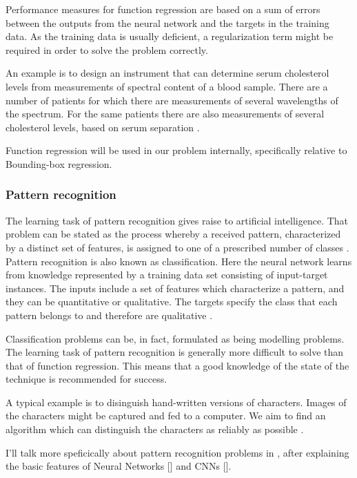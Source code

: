Performance measures for function regression are based on a sum of errors between the outputs from the neural network and the targets in the training data.
As the training data is usually deficient, a regularization term might be required in order to solve the problem correctly.

An example is to design an instrument that can determine serum cholesterol levels from
measurements of spectral content of a blood sample. There are a number of 
patients for which there are measurements of several wavelengths of the spectrum.
For the same patients there are also measurements of several
cholesterol levels, based on serum separation \cite{Demuth2009}.

Function regression will be used in our problem internally, specifically relative to Bounding-box regression.


\subsubsection{Pattern recognition}\label{s:ltask-patt}

The learning task of pattern recognition gives raise to artificial intelligence. That problem can be stated as the process whereby a received pattern, characterized by a distinct
set of features, is assigned to one of a prescribed number of
classes \cite{Haykin1994}. Pattern recognition is also known as classification. Here the neural network learns from knowledge represented by a training data set consisting of input-target instances. The inputs include a set of features which characterize a pattern, and they can be quantitative or qualitative. The targets specify the class that each pattern belongs to and therefore are qualitative \cite{Bishop1995}.

Classification problems can be, in fact, formulated as being modelling problems. 
The learning task of pattern recognition is generally more difficult to solve than that of function regression. 
This means that a good knowledge of the state of the technique is recommended for success. 

A typical example is to disinguish hand-written versions of characters. 
Images of the characters might be captured and fed to a computer. 
We aim to find an algorithm which can distinguish the characters as reliably as possible  \cite{Bishop1995}. 

I'll talk more speficically about pattern recognition problems in , after explaining the basic features of Neural Networks [] and CNNs [].

